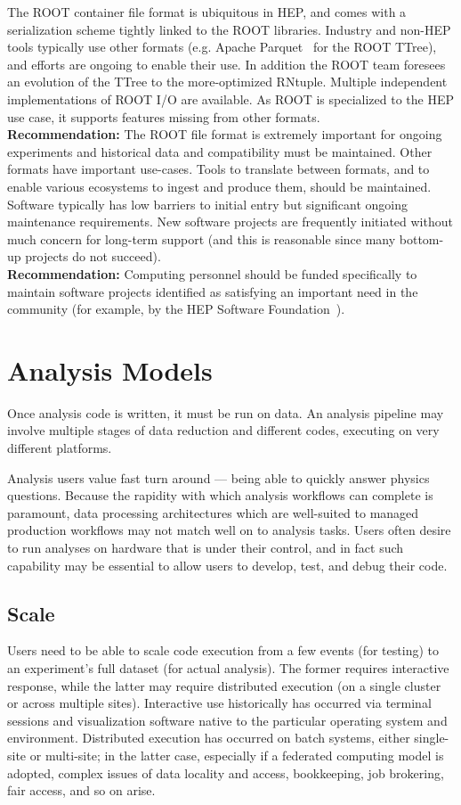 The ROOT container file format is ubiquitous in HEP, and comes with a serialization scheme tightly linked to the ROOT libraries. Industry and non-HEP tools typically use other formats (e.g. Apache Parquet~\cite{Parquet} for the ROOT TTree), and efforts are ongoing to enable their use. In addition the ROOT team foresees an evolution of the TTree to the more-optimized RNtuple. Multiple independent implementations of ROOT I/O are available. As ROOT is specialized to the HEP use case, it supports features missing from other formats.\\
\textbf{Recommendation:} The ROOT file format is extremely important for ongoing experiments and historical data and compatibility must be maintained. Other formats have important use-cases. Tools to translate between formats, and to enable various ecosystems to ingest and produce them, should be maintained.\\

Software typically has low barriers to initial entry but significant ongoing maintenance requirements. New software projects are frequently initiated without much concern for long-term support (and this is reasonable since many bottom-up projects do not succeed).\\
\textbf{Recommendation:} Computing personnel should be funded specifically to maintain software projects identified as satisfying an important need in the community (for example, by the HEP Software Foundation~\cite{HSF}). 


\section{Analysis Models}
Once analysis code is written, it must be run on data. An analysis pipeline may involve multiple stages of data reduction and different codes, executing on very different platforms.

Analysis users value fast turn around --- being able to quickly answer physics questions. Because the rapidity with which analysis workflows can complete is paramount, data processing architectures which are well-suited to managed production workflows may not match well on to analysis tasks. Users often desire to run analyses on hardware that is under their control, and in fact such capability may be essential to allow users to develop, test, and debug their code. 

\subsection{Scale}
Users need to be able to scale code execution from a few events (for testing) to an experiment's full dataset (for actual analysis). The former requires interactive response, while the latter may require distributed execution (on a single cluster or across multiple sites). Interactive use historically has occurred via terminal sessions and visualization software native to the particular operating system and environment. Distributed execution has occurred on batch systems, either single-site or multi-site; in the latter case, especially if a federated computing model is adopted, complex issues of data locality and access, bookkeeping, job brokering, fair access, and so on arise.

